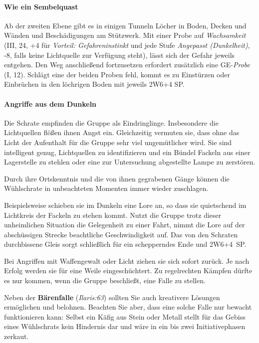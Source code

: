 \paragraph{\textbf{Wie ein Sembelquast}}

Ab der zweiten Ebene gibt es in einigen Tunneln Löcher in Boden, Decken und Wänden und Beschädigungen am Stützwerk.
Mit einer Probe auf \emph{Wachsamkeit} (III, 24, +4 für \emph{Vorteil: Gefahreninstinkt} und jede Stufe \emph{Angepasst (Dunkelheit)}, -8, falls keine Lichtquelle zur Verfügung steht),
lässt sich der Gefahr jeweils entgehen.
Den Weg anschließend fortzusetzen erfordert zusätzlich eine GE-\emph{Probe} (I, 12).
Schlägt eine der beiden Proben fehl, kommt es zu Einstürzen oder Einbrüchen in den löchrigen Boden mit jeweils 2W6+4 SP.

\paragraph{\textbf{Angriffe aus dem Dunkeln}}

Die Schrate empfinden die Gruppe als Eindringlinge.
Insbesondere die Lichtquellen flößen ihnen Angst ein.
Gleichzeitig vermuten sie, dass ohne das Licht der Aufenthalt für die Gruppe sehr viel ungemütlicher wird.
Sie sind intelligent genug, Lichtquellen zu identifizieren und ein Bündel Fackeln aus einer Lagerstelle zu stehlen oder eine zur Untersuchung abgestellte Lampe zu zerstören.

Durch ihre Ortskenntnis und die von ihnen gegrabenen Gänge können die Wühlschrate in unbeachteten Momenten immer wieder zuschlagen.

 Beispielsweise schieben sie im Dunkeln eine Lore an, so dass sie quietschend im Lichtkreis der Fackeln zu stehen kommt.
Nutzt die Gruppe trotz dieser unheimlichen Situation die Gelegenheit zu einer Fahrt, nimmt die Lore auf der abschüssigen Strecke beachtliche Geschwindigkeit auf.
Das von den Schraten durchbissene Gleis sorgt schließlich für ein schepperndes Ende und 2W6+4~SP.

Bei Angriffen mit Waffengewalt oder Licht ziehen sie sich sofort zurück. Je nach Erfolg werden sie für eine Weile eingeschüchtert.
Zu regelrechten Kämpfen dürfte es nur kommen, wenn die Gruppe beschließt, eine Falle zu stellen.

Neben der \textbf{Bärenfalle} (\emph{Ilaris:63}) sollten Sie auch kreativere Lösungen ermöglichen und belohnen.
Beachten Sie aber, dass eine solche Falle nur bewacht funktionieren kann:
Selbst ein Käfig aus Stein oder Metall stellt für das Gebiss eines Wühlschrats kein Hindernis dar und wäre in ein bis zwei Initiativephasen zerkaut.


